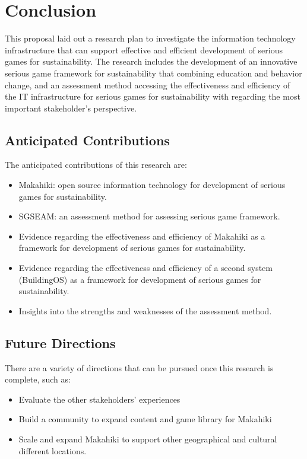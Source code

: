 \chapter{Conclusion}
\label{cha:conclusion}

This proposal laid out a research plan to investigate the information technology infrastructure that can support effective and efficient development of serious games for sustainability. The research includes the development of an innovative serious game framework for sustainability that combining education and behavior change, and an assessment method accessing the effectiveness and efficiency of the IT infrastructure for serious games for sustainability with regarding the most important stakeholder's perspective.

\section{Anticipated Contributions}

The anticipated contributions of this research are:

\begin{itemize}
	\item Makahiki: open source information technology for development of serious games for sustainability.
	\item SGSEAM: an assessment method for assessing serious game framework.
	\item Evidence regarding the effectiveness and efficiency of Makahiki as a framework for development of serious games for sustainability.
	\item Evidence regarding the effectiveness and efficiency of a second system (BuildingOS) as a framework for development of serious games for sustainability.
	\item Insights into the strengths and weaknesses of the assessment method.
\end{itemize}

\section{Future Directions}

There are a variety of directions that can be pursued once this research is complete, such as:

\begin{itemize}
	\item Evaluate the other stakeholders’ experiences

    \item Build a community to expand content and game library for Makahiki

    \item Scale and expand Makahiki to support other geographical and cultural different locations.

\end{itemize}

